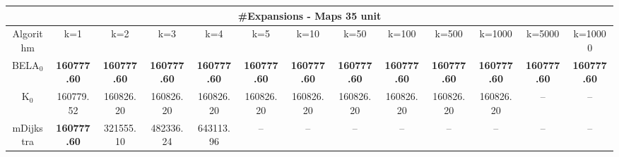 \begin{tabular}{c|cccccccccccc}\toprule
\multicolumn{13}{c}{#Expansions - Maps 35 unit}\\ \midrule
Algorithm & k=1 & k=2 & k=3 & k=4 & k=5 & k=10 & k=50 & k=100 & k=500 & k=1000 & k=5000 & k=10000 \\ \midrule
BELA$_0$ & \textbf{160777.60} & \textbf{160777.60} & \textbf{160777.60} & \textbf{160777.60} & \textbf{160777.60} & \textbf{160777.60} & \textbf{160777.60} & \textbf{160777.60} & \textbf{160777.60} & \textbf{160777.60} & \textbf{160777.60} & \textbf{160777.60} \\
K$_0$ & 160779.52 & 160826.20 & 160826.20 & 160826.20 & 160826.20 & 160826.20 & 160826.20 & 160826.20 & 160826.20 & 160826.20 & -- & -- \\
mDijkstra & \textbf{160777.60} & 321555.10 & 482336.24 & 643113.96 & -- & -- & -- & -- & -- & -- & -- & -- \\ \bottomrule 
\end{tabular}
